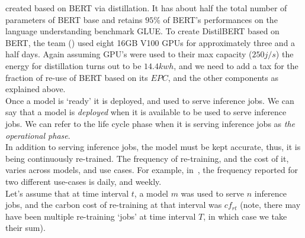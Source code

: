 created based on BERT via distillation. It has about half the total number of parameters of BERT base and retains $95\%$ of BERT’s performances on the language understanding benchmark GLUE.
To create DistilBERT based on BERT, the team (\cite{distillbert}) used eight 16GB V100 GPUs for approximately three and a half days. Again assuming GPU's were used to their max capacity ($250j/s$) the energy for distillation turns out to be $14.4kwh$, and we need to add a tax for the fraction of re-use of BERT based on its $EPC$, and the other components as explained above.
\\
Once a model is `ready' it is deployed, and used to serve inference jobs. 
We can say that a model is {\em deployed} when it is available to be used to serve inference jobs. 
We can refer to the life cycle phase when it is serving inference jobs as {\em the operational phase}. 
\\
In addition  to serving inference jobs, the model must be kept accurate,
thus, it is being continuously re-trained. The frequency of re-training, and the cost of it, varies across models, and use cases. For example, in~\cite{Wu2022}, the frequency reported for two different use-cases is
daily, and weekly. 
\\
Let's assume that at time interval $t$, a model $m$ was used to serve $n$ inference jobs, and the carbon cost of re-training at that interval was $cf_{rt}$ (note, there may have been multiple re-training `jobs' at time interval $T$, in which case we take their sum).
